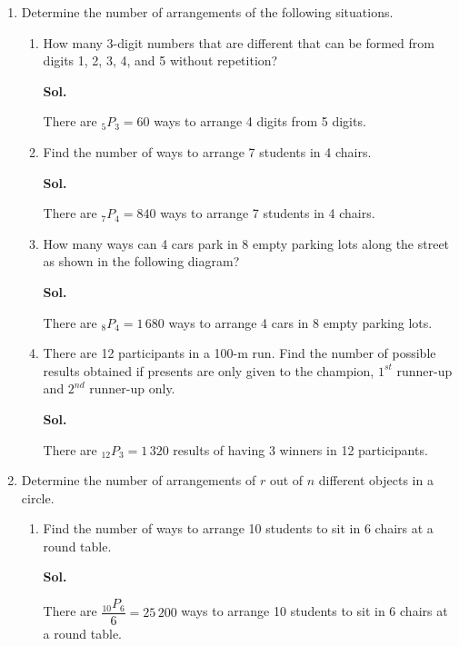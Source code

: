\documentclass{report}
\newcommand\permtwo[2][^n]{{}_{#1}P_{#2}}
\newcommand{\sol}[1]{

      \noindent \textbf{Sol.}
}
\def\eos{\quad\hbox{\rlap{\hbox{\vrule depth 1.5pt height 2.6mm width 0.2mm \hskip 1mm \vrule height 2.6mm width 0.2mm}}{\vbox{\hrule height 0.2mm width 1.4mm \vskip 2.8mm \hrule depth 1.5pt height -0.35mm width 1.2mm}}}}
\begin{document}
\begin{multicols*}{2}
\begin{enumerate}
            \item Determine the number of arrangements of the following situations.
                  \begin{enumerate}
                        \item How many 3-digit numbers that are different that can be formed from digits 1,
                              2, 3, 4, and 5 without repetition? \sol{}

                              There are $\permtwo[5]{3} = 60$ ways to arrange 4 digits from 5 digits. $\eos$

                        \item Find the number of ways to arrange 7 students in 4 chairs. \sol{}

                              There are $\permtwo[7]{4} = 840$ ways to arrange 7 students in 4 chairs. $\eos$

                        \item How many ways can 4 cars park in 8 empty parking lots along the street as shown
                              in the following diagram? \sol{}

                              There are $\permtwo[8]{4} = 1\,680$ ways to arrange 4 cars in 8 empty parking
                              lots. $\eos$

                        \item There are 12 participants in a 100-m run. Find the number of possible results
                              obtained if presents are only given to the champion, $1^{st}$ runner-up and
                              $2^{nd}$ runner-up only. \sol{}

                              There are $\permtwo[12]{3} = 1\,320$ results of having 3 winners in 12
                              participants. $\eos$
                  \end{enumerate}

            \item Determine the number of arrangements of $r$ out of $n$ different objects in a
                  circle.
                  \begin{enumerate}
                        \item Find the number of ways to arrange 10 students to sit in 6 chairs at a round
                              table. \sol{}

                              There are $\dfrac{\permtwo[10]{6}}{6} = 25\,200$ ways to arrange 10 students to
                              sit in 6 chairs at a round table. $\eos$


\end{enumerate}
\end{enumerate}
\end{multicols*}
\end{document}
